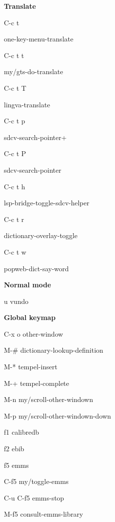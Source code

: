 \documentclass[10pt]{article}
\renewcommand\section[1]{\bigskip\par\textbf{\color{heading}\large#1}\smallskip}
\renewcommand\subsection[1]{\smallskip\par\textbf{\color{heading}#1}}
\newcommand\humanreadable[1]{{\par\color{default}\small\sffamily#1}}
\begin{document}
\begin{multicols}{4}
  \subsection{Translate}
  \begin{keylist}
    \item[C-c t] \humanreadable{one-key-menu-translate}
    \item[C-c t t] \humanreadable{my/gts-do-translate}
    \item[C-c t T] \humanreadable{lingva-translate}
    \item[C-c t p] \humanreadable{sdcv-search-pointer+}
    \item[C-c t P] \humanreadable{sdcv-search-pointer}
    \item[C-c t h] \humanreadable{lsp-bridge-toggle-sdcv-helper}
    \item[C-c t r] \humanreadable{dictionary-overlay-toggle}
    \item[C-c t w] \humanreadable{popweb-dict-say-word}
  \end{keylist}

  \section{Normal mode}
  \begin{keylist}
    \item[u] vundo
  \end{keylist}

  \section{Global keymap}
  \begin{keylist}
    \item[C-x o] other-window
    \item[M-\#] dictionary-lookup-definition
    \item[M-*] tempel-insert
    \item[M-+] tempel-complete
    \item[M-n] my/scroll-other-windown
    \item[M-p] my/scroll-other-windown-down

    \item[f1] calibredb
    \item[f2] ebib

    \item[f5] emms
    \item[C-f5] my/toggle-emms
    \item[C-u C-f5] emms-stop
    \item[M-f5] consult-emms-library


\end{keylist}
\end{multicols}
\end{document}
